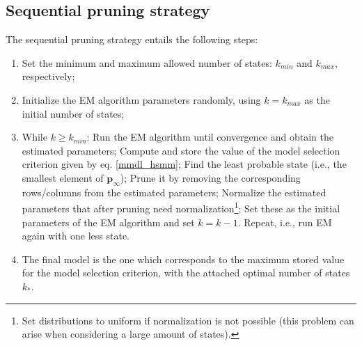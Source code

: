 \documentclass[extendedabs]{recpad2k}
\begin{document}
\subsection{Sequential pruning strategy}
The sequential pruning strategy entails the following steps:
\begin{enumerate}[topsep=0pt,itemsep=-1ex,partopsep=1ex,parsep=1ex]
    \item Set the minimum and maximum allowed number of states: $k_{min}$ and $k_{max}$, respectively;
    \item Initialize the EM algorithm parameters randomly, using $k = k_{max}$ as the initial number of states;
    \item While $k\geq k_{min}$: Run the EM algorithm until convergence and obtain the estimated parameters; Compute and store the value of the model selection criterion given by eq. \eqref{mmdl_hsmm}; Find the least probable state (i.e., the smallest element of $\boldsymbol{p}_\infty$); Prune it by removing the corresponding rows/columns from the estimated parameters; Normalize the estimated parameters that after pruning need normalization\footnote{Set distributions to uniform if normalization is not possible (this problem can arise when considering a large amount of states).}; Set these as the initial parameters of the EM algorithm and set $k=k-1$. Repeat, i.e., run EM again with one less state.
    \item The final model is the one which corresponds to the maximum stored value for the model selection criterion, with the attached optimal number of states $k_*$.
\end{enumerate}
\end{document}
